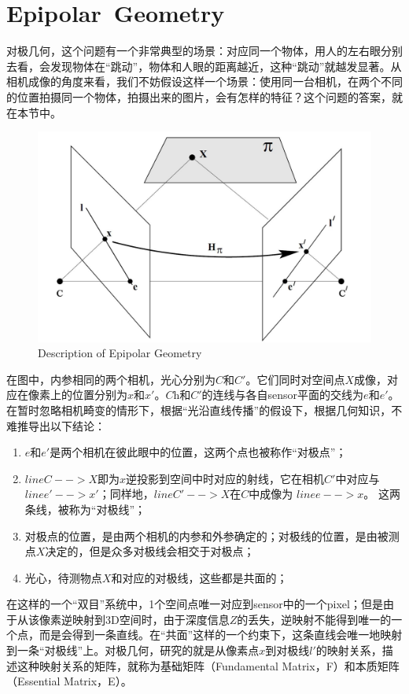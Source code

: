 \section{Epipolar Geometry}
对极几何，这个问题有一个非常典型的场景：对应同一个物体，用人的左右眼分别去看，会发现物体在“跳动”，物体和人眼的距离越近，这种“跳动”就越发显著。从相机成像的角度来看，我们不妨假设这样一个场景：使用同一台相机，在两个不同的位置拍摄同一个物体，拍摄出来的图片，会有怎样的特征？这个问题的答案，就在本节中。
\begin{figure}[H]
\centering
\includegraphics[scale=0.3]{Chapter1/DescriptionOfEpio.jpeg}
\caption{Description of Epipolar Geometry}
\end{figure}
在图中，内参相同的两个相机，光心分别为$C$和$C'$。它们同时对空间点$X$成像，对应在像素上的位置分别为$x$和$x'$。$C$h和$C'$的连线与各自sensor平面的交线为$e$和$e'$。在暂时忽略相机畸变的情形下，根据“光沿直线传播”的假设下，根据几何知识，不难推导出以下结论：
\begin{enumerate}
\item $e$和$e'$是两个相机在彼此眼中的位置，这两个点也被称作“对极点”；
\item $line C-->X$即为$x$逆投影到空间中时对应的射线，它在相机$C'$中对应与$line e' --> x'$；同样地，$line C' --> X$在$C$中成像为 $line e-->x$。 这两条线，被称为“对极线”；
\item 对极点的位置，是由两个相机的内参和外参确定的；对极线的位置，是由被测点$X$决定的，但是众多对极线会相交于对极点；
\item 光心，待测物点$X$和对应的对极线，这些都是共面的；
\end{enumerate}
在这样的一个“双目”系统中，1个空间点唯一对应到sensor中的一个pixel；但是由于从该像素逆映射到3D空间时，由于深度信息$Z$的丢失，逆映射不能得到唯一的一个点，而是会得到一条直线。在“共面”这样的一个约束下，这条直线会唯一地映射到一条“对极线”上。对极几何，研究的就是从像素点$x$到对极线$l'$的映射关系，描述这种映射关系的矩阵，就称为基础矩阵（Fundamental Matrix，F）和本质矩阵（Essential Matrix，E）。\par
